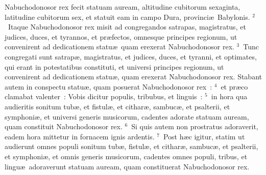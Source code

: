 \bchapter
\lettrine[lines=3,image=true,loversize=0.05,lraise=-0.03]{N}{}abuchodonosor rex fecit statuam auream, altitudine cubitorum sexaginta, latitudine cubitorum sex, et statuit eam in campo Dura, provinci\ae\ Babylonis.
${}^{2}$~Itaque Nabuchodonosor rex misit ad congregandos satrapas, magistratus, et judices, duces, et tyrannos, et pr\ae fectos, omnesque principes regionum, ut convenirent ad dedicationem statu\ae\ quam erexerat Nabuchodonosor rex.
${}^{3}$~Tunc congregati sunt satrap\ae , magistratus, et judices, duces, et tyranni, et optimates, qui erant in potestatibus constituti, et universi principes regionum, ut convenirent ad dedicationem statu\ae , quam erexerat Nabuchodonosor rex. Stabant autem in conspectu statu\ae , quam posuerat Nabuchodonosor rex~:
${}^{4}$~et pr\ae co clamabat valenter~: Vobis dicitur populis, tribubus, et linguis~:
${}^{5}$~in hora qua audieritis sonitum tub\ae , et fistul\ae , et cithar\ae , sambuc\ae , et psalterii, et symphoni\ae , et universi generis musicorum, cadentes adorate statuam auream, quam constituit Nabuchodonosor rex.
${}^{6}$~Si quis autem non prostratus adoraverit, eadem hora mittetur in fornacem ignis ardentis.
${}^{7}$~Post h\ae c igitur, statim ut audierunt omnes populi sonitum tub\ae , fistul\ae , et cithar\ae , sambuc\ae , et psalterii, et symphoni\ae , et omnis generis musicorum, cadentes omnes populi, tribus, et lingu\ae\ adoraverunt statuam auream, quam constituerat Nabuchodonosor rex.


